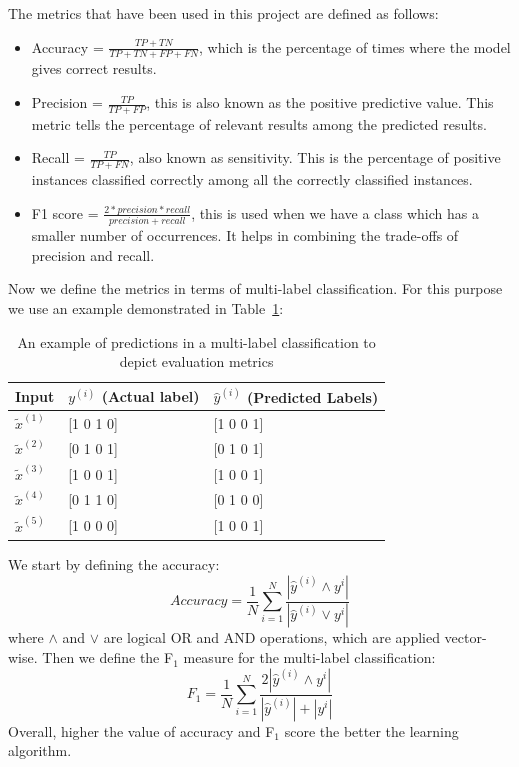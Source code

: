 The metrics that have been used in this project are defined as follows: 
\begin{itemize}
    \item Accuracy = $\frac{TP+TN}{TP + TN + FP + FN}$, which is the percentage of times where the model gives correct results. 
    \item Precision = $\frac{TP}{TP + FP}$, this is also known as the positive predictive value. This metric tells the percentage of relevant results among the predicted results. 
    \item Recall = $\frac{TP}{TP + FN}$, also known as sensitivity. This is the percentage of positive instances classified correctly among all the correctly classified instances. 
    \item F1 score = $\frac{2*precision*recall}{precision + recall}$, this is used when we have a class which has a smaller number of occurrences. It helps in combining the trade-offs of precision and recall. 
\end{itemize}

Now we define the metrics in terms of multi-label classification. For this purpose we use an example demonstrated in Table~\ref{tab:multilabelmetrics}:

\begin{table}[!htb]
    \centering
    \begin{tabular}{|l|l|l|}
\hline
Input & $y^{(i)}$ (Actual label) & $\hat{y}^{(i)}$ (Predicted Labels) \\ \hline
$\tilde{x}^{(1)}$ & [1 0 1 0] & [1 0 0 1] \\ \hline
$\tilde{x}^{(2)}$ & [0 1 0 1] & [0 1 0 1] \\ \hline
$\tilde{x}^{(3)}$ & [1 0 0 1] & [1 0 0 1] \\ \hline
$\tilde{x}^{(4)}$ & [0 1 1 0] & [0 1 0 0] \\ \hline
$\tilde{x}^{(5)}$ & [1 0 0 0] & [1 0 0 1] \\ \hline
\end{tabular}
    \caption{An example of predictions in a multi-label classification to depict evaluation metrics}
    \label{tab:multilabelmetrics}
\end{table}

We start by defining the accuracy:
    \begin{equation}
      Accuracy = \frac{1}{N}\sum_{i=1}^N\frac{|\hat{y}^{(i)} \wedge y^{i}|}{|\hat{y}^{(i)} \vee y^{i}|}
    \end{equation}    
where $\wedge$ and $\vee$ are logical OR and AND operations, which are applied vector-wise. 
Then we define the F$_1$ measure for the multi-label classification:
\begin{equation}
    F_1 = \frac{1}{N}\sum_{i=1}^N\frac{2|\hat{y}^{(i)} \wedge y^{i}|}{|\hat{y}^{(i)}| + |y^{i}|}
\end{equation}
Overall, higher the value of accuracy and F$_1$ score the better the learning algorithm. 

